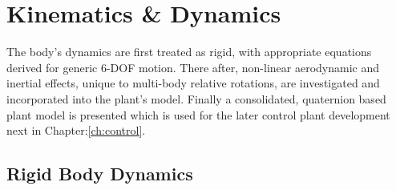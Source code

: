 \chapter{Kinematics \& Dynamics}
\label{ch:dynamics}
The body's dynamics are first treated as rigid, with appropriate equations derived for generic 6-DOF motion. There after, non-linear aerodynamic and inertial effects, unique to multi-body relative rotations, are investigated and incorporated into the plant's model. Finally a consolidated, quaternion based plant model is presented which is used for the later control plant development next in Chapter:\ref{ch:control}.
\section{Rigid Body Dynamics}
\label{sec:dynamics.rigidbody}
